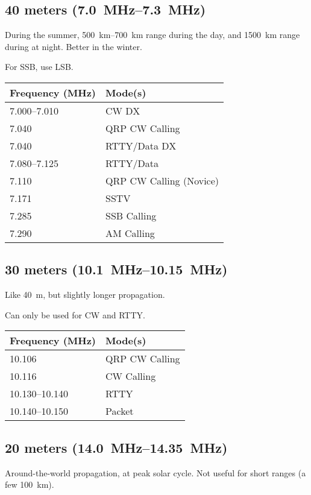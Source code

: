 \documentclass[11pt, onecolumn, table]{article}
\begin{document}
\subsection{40 meters (\SIrange{7.0}{7.3}{\MHz})}
During the summer, \SIrange{500}{700}{\km} range during the day,
and \SI{1500}{\km} range during at night. Better in the winter.

For SSB, use LSB.
\begin{center}
  \begin{tabular}{l l}
    {Frequency (\si{\MHz})}	& Mode(s)					\\
    \midrule
    \numrange{7.000}{7.010}	& CW DX						\\
    \num{7.040}				& QRP CW Calling			\\
    \num{7.040}				& RTTY/Data DX				\\
    \numrange{7.080}{7.125}	& RTTY/Data					\\
    \num{7.110}				& QRP CW Calling (Novice)	\\
    \num{7.171}				& SSTV						\\
    \num{7.285}				& SSB Calling				\\
    \num{7.290}				& AM Calling				\\
  \end{tabular}
\end{center}


\subsection{30 meters (\SIrange{10.1}{10.15}{\MHz})}
Like \SI{40}{m}, but slightly longer propagation.

Can only be used for CW and RTTY.
\begin{center}
  \begin{tabular}{l l}
    {Frequency (\si{\MHz})}		& Mode(s)			\\
    \midrule
    \num{10.106}				& QRP CW Calling	\\
    \num{10.116}				& CW Calling		\\
    \numrange{10.130}{10.140}	& RTTY				\\
    \numrange{10.140}{10.150}	& Packet			\\
  \end{tabular}
\end{center}


\subsection{20 meters (\SIrange{14.0}{14.35}{\MHz})}
Around-the-world propagation, at peak solar cycle. Not
useful for short ranges (a few \SI{100}{\km}).
\end{document}
